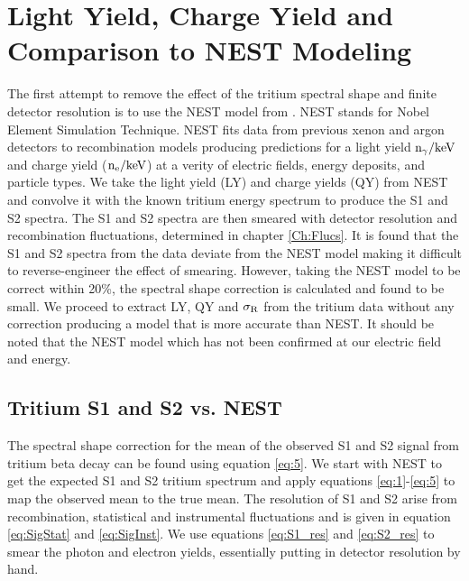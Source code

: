 \section{Light Yield, Charge Yield and Comparison to NEST Modeling}

The first attempt to remove the effect of the tritium spectral shape and finite detector resolution is to use the NEST model from \cite{NEST_2013}. 
NEST stands for Nobel Element Simulation Technique. NEST fits data from previous xenon and argon detectors to recombination models producing predictions for a light yield $\rm n_\gamma/keV$ and charge yield ($\rm n_e/keV$) at a verity of electric fields, energy deposits, and particle types. We take the light yield (LY) and charge yields (QY) from NEST and convolve it with the known tritium energy spectrum to produce the S1 and S2 spectra. The S1 and S2 spectra are then smeared with detector resolution and recombination fluctuations, determined in chapter \ref{Ch:Flucs}. It is found  that the S1 and S2 spectra from the data deviate from the NEST model making it difficult to reverse-engineer the effect of smearing. However, taking the NEST model to be correct within 20\%, the spectral shape correction is calculated and found to be small. We proceed to extract LY, QY and $\rm \sigma_R$ from the tritium data without any correction producing a model that is more accurate than NEST. It should be noted that the NEST model which has not been confirmed at our electric field and energy. %



\subsection{Tritium S1 and S2 vs. NEST}
\label{sec:Spec_Corr}

The spectral shape correction for the mean of the observed S1 and S2 signal from tritium beta decay can be found using equation \ref{eq:5}. We start with NEST to get the expected S1 and S2 tritium spectrum and apply equations \ref{eq:1}-\ref{eq:5} to map the observed mean to the true mean. The resolution of S1 and S2 arise from recombination, statistical and instrumental fluctuations and is given in equation \ref{eq:SigStat} and \ref{eq:SigInst}. We use equations \ref{eq:S1_res} and \ref{eq:S2_res} to smear the photon and electron yields, essentially putting in detector resolution by hand.


